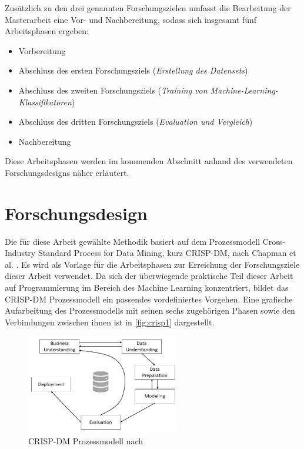 \label{phases_definition}

Zusätzlich zu den drei genannten Forschungszielen umfasst die Bearbeitung der Masterarbeit eine Vor- und Nachbereitung, sodass sich insgesamt fünf Arbeitsphasen ergeben:

\begin{itemize}
\setlength{\itemsep}{-2pt}
\item Vorbereitung
\item Abschluss des ersten Forschungsziels (\textit{Erstellung des Datensets})
\item Abschluss des zweiten Forschungsziels (\textit{Training von Machine-Learning-Klassifikatoren})
\item Abschluss des dritten Forschungsziels (\textit{Evaluation und Vergleich})
\item Nachbereitung
\end{itemize}

Diese Arbeitsphasen werden im kommenden Abschnitt anhand des verwendeten Forschungsdesigns näher erläutert.

\section{Forschungsdesign}

Die für diese Arbeit gewählte Methodik basiert auf dem Prozessmodell \glqq Cross-Industry Standard Process for Data Mining\grqq, kurz CRISP-DM, nach Chapman et al. \cite{Chapman2000}. Es wird als Vorlage für die Arbeitsphasen zur Erreichung der Forschungsziele dieser Arbeit verwendet. Da sich der überwiegende praktische Teil dieser Arbeit auf Programmierung im Bereich des Machine Learning konzentriert, bildet das CRISP-DM Prozessmodell ein passendes vordefiniertes Vorgehen. Eine grafische Aufarbeitung des Prozessmodells mit seinen sechs zugehörigen Phasen sowie den Verbindungen zwischen ihnen ist in \autoref{fig:crisp1} dargestellt. 

\begin{figure}[ht]
    \centering
    \includegraphics[width=0.6\textwidth]{images/CRISP-DM1}
    \caption{CRISP-DM Prozessmodell nach \cite{Chapman2000}}\label{fig:crisp1}
\end{figure}

